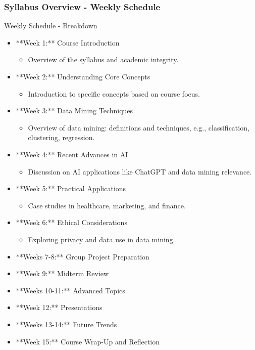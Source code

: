 \documentclass[aspectratio=169]{beamer}
\begin{document}
\begin{frame}[fragile]
    \frametitle{Syllabus Overview - Weekly Schedule}
    \begin{block}{Weekly Schedule - Breakdown}
        \begin{itemize}
            \item **Week 1:** Course Introduction
                \begin{itemize}
                    \item Overview of the syllabus and academic integrity.
                \end{itemize}
            \item **Week 2:** Understanding Core Concepts
                \begin{itemize}
                    \item Introduction to specific concepts based on course focus.
                \end{itemize}
            \item **Week 3:** Data Mining Techniques
                \begin{itemize}
                    \item Overview of data mining: definitions and techniques, e.g., classification, clustering, regression.
                \end{itemize}
            \item **Week 4:** Recent Advances in AI
                \begin{itemize}
                    \item Discussion on AI applications like ChatGPT and data mining relevance.
                \end{itemize}
            \item **Week 5:** Practical Applications
                \begin{itemize}
                    \item Case studies in healthcare, marketing, and finance.
                \end{itemize}
            \item **Week 6:** Ethical Considerations
                \begin{itemize}
                    \item Exploring privacy and data use in data mining.
                \end{itemize}
            \item **Weeks 7-8:** Group Project Preparation
            \item **Week 9:** Midterm Review
            \item **Weeks 10-11:** Advanced Topics
            \item **Week 12:** Presentations
            \item **Weeks 13-14:** Future Trends
            \item **Week 15:** Course Wrap-Up and Reflection
        \end{itemize}
    \end{block}
\end{frame}
\end{document}
